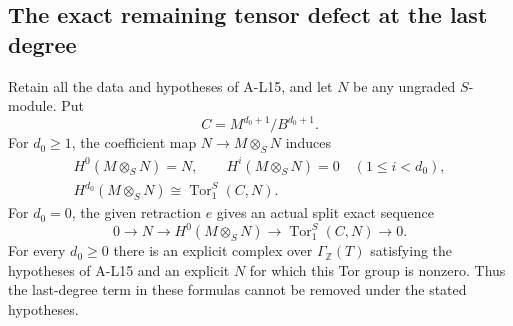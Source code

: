 \subsection{The exact remaining tensor defect at the last degree}

\begin{proposition}
\label{AL16}
Retain all the data and hypotheses of A-L15, and let
$N$ be any ungraded $S$-module. Put
\[
 C=M^{d_0+1}/B^{d_0+1}.
 \tag{AL.84}
\]
For $d_0\geq1$, the coefficient map $N\to M\otimes_SN$
induces
\[
 \begin{gathered}
 H^0(M\otimes_SN)=N,\qquad
 H^i(M\otimes_SN)=0\quad(1\leq i<d_0),\\
 H^{d_0}(M\otimes_SN)
       \cong\operatorname{Tor}^S_1(C,N).
 \end{gathered}
 \tag{AL.85}
\]
For $d_0=0$, the given retraction $e$ gives an actual
split exact sequence
\[
 0\longrightarrow N\longrightarrow H^0(M\otimes_SN)
 \longrightarrow\operatorname{Tor}^S_1(C,N)
 \longrightarrow0.
 \tag{AL.86}
\]
For every $d_0\geq0$ there is an explicit complex over
$\Gamma_{\mathbb Z}(T)$ satisfying the hypotheses of
A-L15 and an explicit $N$ for which this Tor group is
nonzero. Thus the last-degree term in these formulas
cannot be removed under the stated hypotheses.
\end{proposition}


